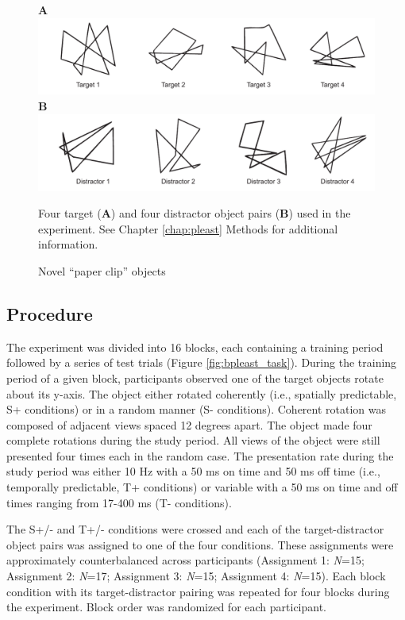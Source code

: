 \documentclass[dwyatte_dissertation.tex]{subfiles}
\begin{document}
\begin{figure}[h!]
\textbf{A} \\
\includegraphics[width=160mm]{figs/chap_bpleast/paperclip_targets.pdf} \\
\textbf{B} \\
\includegraphics[width=160mm]{figs/chap_bpleast/paperclip_distractors.pdf} \\
\caption{Novel ``paper clip'' objects}{Four target (\textbf{A}) and four distractor object pairs (\textbf{B}) used in the experiment. See Chapter \ref{chap:pleast} Methods for additional information.}
\label{fig:bpleast_objs}
\end{figure}

\subsection{Procedure}
The experiment was divided into 16 blocks, each containing a training period followed by a series of test trials (Figure \ref{fig:bpleast_task}). During the training period of a given block, participants observed one of the target objects rotate about its y-axis. The object either rotated coherently (i.e., spatially predictable, S+ conditions) or in a random manner (S- conditions). Coherent rotation was composed of adjacent views spaced 12 degrees apart. The object made four complete rotations during the study period. All views of the object were still presented four times each in the random case. The presentation rate during the study period was either 10 Hz with a 50 ms on time and 50 ms off time (i.e., temporally predictable, T+ conditions) or variable with a 50 ms on time and off times ranging from 17-400 ms (T- conditions). 

The S+/- and T+/- conditions were crossed and each of the target-distractor object pairs was assigned to one of the four conditions. These assignments were approximately counterbalanced across participants (Assignment 1: \textit{N}=15; Assignment 2: \textit{N}=17; Assignment 3: \textit{N}=15; Assignment 4: \textit{N}=15). Each block condition with its target-distractor pairing was repeated for four blocks during the experiment. Block order was randomized for each participant.
\end{document}
